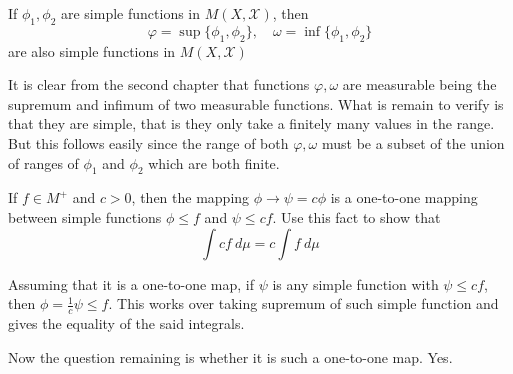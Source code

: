 \begin{exercise}[C]
  If $\phi_1, \phi_2$ are simple functions in $M(X, \mathcal{X})$, then $$\varphi = \sup \{ \phi_1, \phi_2 \},\quad \omega = \inf \{ \phi_1, \phi_2 \}$$ are also simple functions in $M(X, \mathcal{X})$
\end{exercise}
\begin{solution}
   It is clear from the second chapter that functions $\varphi, \omega$ are measurable being the supremum and infimum of two measurable functions. What is remain to verify is that they are simple, that is they only take a finitely many values in the range. But this follows easily since the range of both $\varphi, \omega$ must be a subset of the union of ranges of $\phi_1$ and $\phi_2$ which are both finite.
\end{solution}


\begin{exercise}[D]
  If $f \in M^{+}$ and $c>0$, then the mapping $\phi \to \psi = c \phi$ is a one-to-one mapping between simple functions $\phi \le f$ and $\psi \le cf$. Use this fact to show that \[
      \int cf \ d \mu = c \int f \ d \mu
  \]
\end{exercise}
\begin{solution}
  Assuming that it is a one-to-one map, if $\psi$ is any simple function with $\psi \le cf$, then $\phi = \frac{1}{c}\psi \le f$. This works over taking supremum of such simple function and gives the equality of the said integrals.
  
  Now the question remaining is whether it is such a one-to-one map. Yes.
\end{solution}

